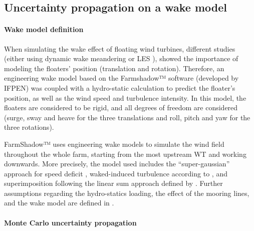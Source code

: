 \subsection{Uncertainty propagation on a wake model}\label{sec:UQ-wake}

\paragraph{Wake model definition}
When simulating the wake effect of floating wind turbines, different studies (either using dynamic wake meandering \cite{wise_2020} or LES \cite{johlas_2020_wake_LES}), showed the importance of modeling the floaters' position (translation and rotation). 
Therefore, an engineering wake model based on the Farmshadow™ software (developed by IFPEN) was coupled with a hydro-static calculation to predict the floater's position, as well as the wind speed and turbulence intensity. 
In this model, the floaters are considered to be rigid, and all degrees of freedom are considered (surge, sway and heave for the three translations and roll, pitch and yaw for the three rotations). 

FarmShadow™ uses engineering wake models to simulate the wind field throughout the whole farm, starting from the most upstream WT and working downwards. 
More precisely, the model used includes the ``super-gaussian'' approach for speed deficit \citep{blondel_2020}, waked-induced turbulence according to \citet{quian_2018}, and superimposition following the linear sum approach defined by \citet{zong_2020}.    
Further assumptions regarding the hydro-statics loading, the effect of the mooring lines, and the wake model are defined in \citet{lovera_fekhari_2023}.


\paragraph{Monte Carlo uncertainty propagation}

